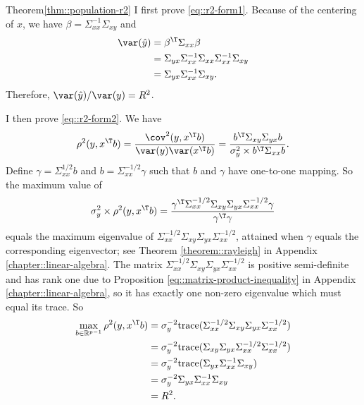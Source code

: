 \begin{myproof}{Theorem}{\ref{thm::population-r2}}
I first prove \eqref{eq::r2-form1}. 
Because of the centering of $x$, we have $\beta = \Sigma_{xx}^{-1}\Sigma_{xy}$ and 
\begin{align*}
\var(  \hat{y}  ) & =\beta^{\T} \Sigma_{xx} \beta\\
 & = \Sigma_{yx} \Sigma_{xx}^{-1}\Sigma_{xx}\Sigma_{xx}^{-1}\Sigma_{xy}\\
 &= \Sigma_{yx}\Sigma_{xx}^{-1}\Sigma_{xy}. 
\end{align*}
Therefore, $\var(  \hat{y}  ) / \var(y) = R^2$. 

I then prove \eqref{eq::r2-form2}. 
We have 
\[
\rho ^{2}(y,x^{\T}b)=\frac{\text{\cov}^{2}(y,x^{\T}b)}{\var(y)\var(x^{\T}b)}=\frac{b^{\T}\Sigma_{xy}\Sigma_{yx}b}{\sigma_{y}^{2}\times b^{\T}\Sigma_{xx}b}.
\]
Define $\gamma=\Sigma_{xx}^{1/2}b$ and $b=\Sigma_{xx}^{-1/2}\gamma$
such that $b$ and $\gamma$ have one-to-one mapping. So the maximum value of 
\[
\sigma_{y}^{2}\times\rho ^{2}(y,x^{\T}b)=\frac{\gamma^{\T}\Sigma_{xx}^{-1/2}\Sigma_{xy}\Sigma_{yx}\Sigma_{xx}^{-1/2}\gamma}{\gamma^{\T}\gamma} 
\]
equals the maximum eigenvalue of $\Sigma_{xx}^{-1/2}\Sigma_{xy}\Sigma_{yx}\Sigma_{xx}^{-1/2}$, attained when $\gamma$ equals the corresponding eigenvector; see Theorem \ref{theorem::rayleigh} in Appendix \ref{chapter::linear-algebra}. 
The matrix $\Sigma_{xx}^{-1/2}\Sigma_{xy}\Sigma_{yx}\Sigma_{xx}^{-1/2}$ is positive semi-definite and has rank one due to Proposition \ref{eq::matrix-product-inequality} in Appendix \ref{chapter::linear-algebra}, so it has exactly one non-zero eigenvalue which must equal its trace. So
\begin{align*}
\max_{b \in \mathbb{R}^{p-1} }\rho ^{2}(y,x^{\T}b) & =\sigma_{y}^{-2}\text{trace}(\Sigma_{xx}^{-1/2}\Sigma_{xy}\Sigma_{yx}\Sigma_{xx}^{-1/2})\\
 & =\sigma_{y}^{-2}\text{trace}(\Sigma_{xy}\Sigma_{yx}\Sigma_{xx}^{-1/2}\Sigma_{xx}^{-1/2})\\
 & =\sigma_{y}^{-2}\text{trace}(\Sigma_{yx}\Sigma_{xx}^{-1}\Sigma_{xy})\\
 & =\sigma_{y}^{-2}\Sigma_{yx}\Sigma_{xx}^{-1}\Sigma_{xy}\\
 & =R^{2}.
\end{align*}





\end{myproof}
